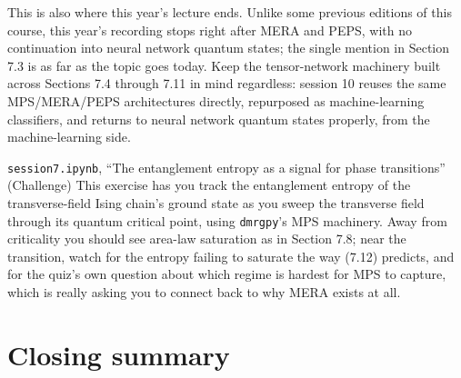 

This is also where this year's lecture ends. Unlike some previous editions of this course, this year's
recording stops right after MERA and PEPS, with no continuation into neural network quantum states; the
single mention in Section 7.3 is as far as the topic goes today. Keep the tensor-network machinery
built across Sections 7.4 through 7.11 in mind regardless: session 10 reuses the same MPS/MERA/PEPS
architectures directly, repurposed as machine-learning classifiers, and returns to neural network
quantum states properly, from the machine-learning side.

\begin{notebookbox}{\texttt{session7.ipynb}, ``The entanglement entropy as a signal for phase transitions'' (Challenge)}
This exercise has you track the entanglement entropy of the transverse-field Ising chain's ground
state as you sweep the transverse field through its quantum critical point, using \texttt{dmrgpy}'s MPS
machinery. Away from criticality you should see area-law saturation as in Section 7.8; near the
transition, watch for the entropy failing to saturate the way (7.12) predicts, and for the quiz's own
question about which regime is hardest for MPS to capture, which is really asking you to connect back
to why MERA exists at all.
\end{notebookbox}

\section{Closing summary}

